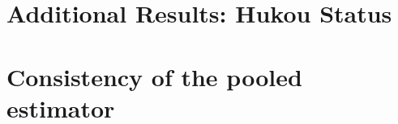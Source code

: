 \documentclass[12pt]{article}
\begin{document}
\newpage
\section{Additional Results: Hukou Status}\label{app:temp}

\clearpage
\newpage
\section{Consistency of the pooled estimator}\label{app:pooling}






% 
% 
% 
% 
% 
% 
\end{document}
